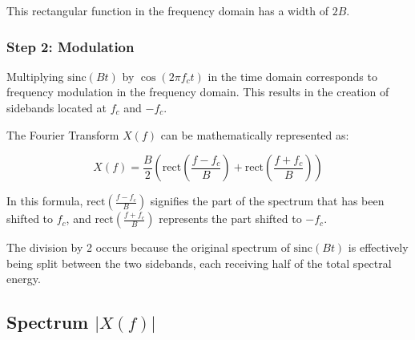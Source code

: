 \documentclass{article}
\begin{document}
This rectangular function in the frequency domain has a width of \( 2B \).

\subsubsection*{Step 2: Modulation}

Multiplying \( \text{sinc}(Bt) \) by \( \cos(2\pi f_c t) \) in the time domain corresponds to frequency modulation in the frequency domain. This results in the creation of sidebands located at \( f_c \) and \( -f_c \).

The Fourier Transform \( X(f) \) can be mathematically represented as:

\[
X(f) = \frac{B}{2} \left( \text{rect}\left(\frac{f - f_c}{B}\right) + \text{rect}\left(\frac{f + f_c}{B}\right) \right)
\]

In this formula, \( \text{rect}\left(\frac{f - f_c}{B}\right) \) signifies the part of the spectrum that has been shifted to \( f_c \), and \( \text{rect}\left(\frac{f + f_c}{B}\right) \) represents the part shifted to \( -f_c \).

The division by 2 occurs because the original spectrum of \( \text{sinc}(Bt) \) is effectively being split between the two sidebands, each receiving half of the total spectral energy.


\subsection*{Spectrum \( |X(f)| \)}
\end{document}
